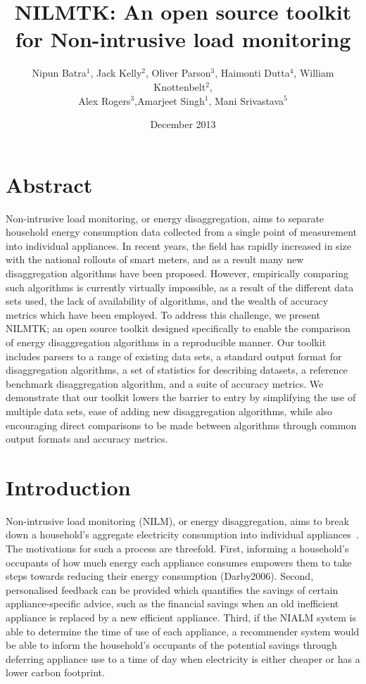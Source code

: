 \documentclass{sig-alternate}
\title{NILMTK: An open source toolkit for Non-intrusive load monitoring}
\author{Nipun Batra$^1$, Jack Kelly$^2$, Oliver Parson$^3$, Haimonti Dutta$^4$, William Knottenbelt$^2$,\\ Alex Rogers$^3$,Amarjeet Singh$^1$, Mani Srivastava$^5$}
\date{December 2013}
\begin{document}
\maketitle

\section{Abstract}
Non-intrusive load monitoring, or energy disaggregation, aims to separate household energy consumption data collected from a single point of measurement into individual appliances. In recent years, the field has rapidly increased in size with the national rollouts of smart meters, and as a result many new disaggregation algorithms have been proposed. However, empirically comparing such algorithms is currently virtually impossible, as a result of the different data sets used, the lack of availability of algorithms, and the wealth of accuracy metrics which have been employed. To address this challenge, we present NILMTK; an open source toolkit designed specifically to enable the comparison of energy disaggregation algorithms in a reproducible manner. Our toolkit includes parsers to a range of existing data sets, a standard output format for disaggregation algorithms, a set of statistics for describing datasets, a reference benchmark disaggregation algorithm, and a suite of accuracy metrics. We demonstrate that our toolkit lowers the barrier to entry by simplifying the use of multiple data sets, ease of adding new disaggregation algorithms, while also encouraging direct comparisons to be made between algorithms through common output formats and accuracy metrics.

\section{Introduction}
Non-intrusive load monitoring (NILM), or energy disaggregation, aims to break down a household's aggregate electricity consumption into individual appliances~\cite{hart_1992}. The motivations for such a process are threefold. First, informing a household's occupants of how much energy each appliance consumes empowers them to take steps towards reducing their energy consumption (Darby2006). Second, personalised feedback can be provided which quantifies the savings of certain appliance-specific advice, such as the financial savings when an old inefficient appliance is replaced by a new efficient appliance. Third, if the NIALM system is able to determine the time of use of each appliance, a recommender system would be able to inform the household's occupants of the potential savings through deferring appliance use to a time of day when electricity is either cheaper or has a lower carbon footprint.
\end{document}

